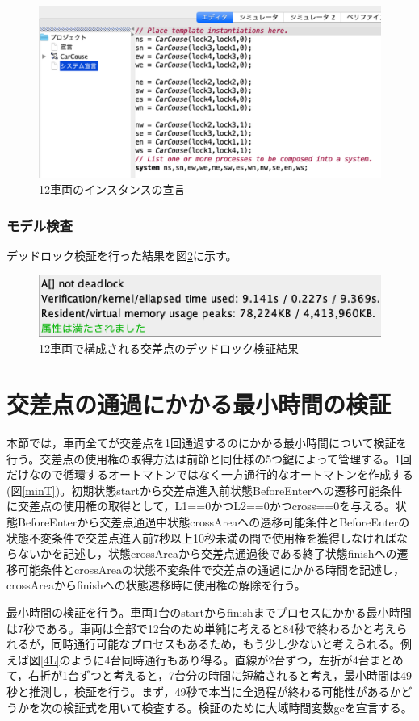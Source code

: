 \documentclass{tpu-sotu}
\begin{document}
	\begin{figure}[htbp]
	\centering
	\includegraphics[width=140mm]{SimpleSD.png}
	\caption{12車両のインスタンスの宣言}
	\label{SimpleSD}
	\end{figure}
	\subsubsection{モデル検査}
	デッドロック検証を行った結果を図\ref{SimV}に示す。
	\begin{figure}[htbp]
	\centering
	\includegraphics[width=120mm]{SimV.png}
	\caption{12車両で構成される交差点のデッドロック検証結果}
	\label{SimV}
	\end{figure}
	\section{交差点の通過にかかる最小時間の検証}
	本節では，車両全てが交差点を1回通過するのにかかる最小時間について検証を行う。交差点の使用権の取得方法は前節と同仕様の5つ鍵によって管理する。1回だけなので循環するオートマトンではなく一方通行的なオートマトンを作成する(図\ref{minT})。初期状態startから交差点進入前状態BeforeEnterへの遷移可能条件に交差点の使用権の取得として，L1==0かつL2==0かつcross==0を与える。状態BeforeEnterから交差点通過中状態crossAreaへの遷移可能条件とBeforeEnterの状態不変条件で交差点進入前7秒以上10秒未満の間で使用権を獲得しなければならないかを記述し，状態crossAreaから交差点通過後である終了状態finishへの遷移可能条件とcrossAreaの状態不変条件で交差点の通過にかかる時間を記述し，crossAreaからfinishへの状態遷移時に使用権の解除を行う。
	
	最小時間の検証を行う。車両1台のstartからfinishまでプロセスにかかる最小時間は7秒である。車両は全部で12台のため単純に考えると84秒で終わるかと考えられるが，同時通行可能なプロセスもあるため，もう少し少ないと考えられる。例えば図\ref{4L}のように4台同時通行もあり得る。直線が2台ずつ，左折が4台まとめて，右折が1台ずつと考えると，7台分の時間に短縮されると考え，最小時間は49秒と推測し，検証を行う。まず，49秒で本当に全過程が終わる可能性があるかどうかを次の検証式を用いて検査する。検証のために大域時間変数gcを宣言する。
	
\end{document}
